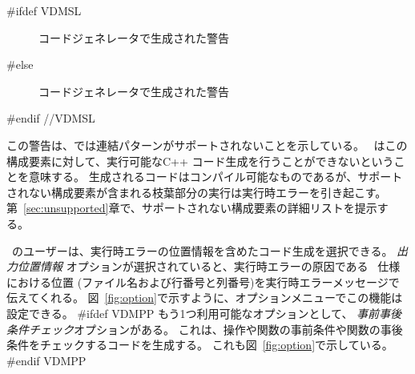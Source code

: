 \documentclass[\pformat,12pt]{jarticle}
\begin{document}
#ifdef VDMSL
\begin{figure}[tbh]
\begin{center}
\mbox{}
\caption{コードジェネレータで生成された警告}\label{fig:cg_error}
\end{center}
\end{figure}
#else
\begin{figure}[tbh]
\begin{center}
\mbox{}
\caption{コードジェネレータで生成された警告}\label{fig:cg_error}
\end{center}
\end{figure}
#endif //VDMSL


この警告は、\tcg{}では連結パターンがサポートされないことを示している。
\tcg\ はこの構成要素に対して、実行可能なC++ コード生成を行うことができないということを意味する。
生成されるコードはコンパイル可能なものであるが、サポートされない構成要素が含まれる枝葉部分の実行は実行時エラーを引き起こす。 
第~\ref{sec:unsupported}章で、サポートされない構成要素の詳細リストを提示する。

\tcg\ のユーザーは、実行時エラーの位置情報を含めたコード生成を選択できる。
{\em 出力位置情報} オプションが選択されていると、実行時エラーの原因である \VDM\ 仕様における位置 (ファイル名および行番号と列番号)を実行時エラーメッセージで伝えてくれる。
 図~\ref{fig:option}で示すように、オプションメニューでこの機能は設定できる。
#ifdef VDMPP
もう1つ利用可能なオプションとして、 \textit{事前事後条件チェック}オプションがある。
これは、操作や関数の事前条件や関数の事後条件をチェックするコードを生成する。
これも図~\ref{fig:option}で示している。
#endif VDMPP
\end{document}
